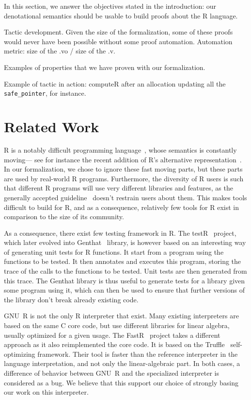 \documentclass[
    sigplan,
    10pt,
    review, %
    natbib=false %
 ]{acmart}
\begin{document}
In this section,
we answer the objectives stated in the introduction:
our denotational semantics should be usable to build proofs about the R language.

\todo{}

Tactic development.
Given the size of the formalization, some of these proofs would never have been possible
without some proof automation.
Automation metric: size of the .vo / size of the .v.

Examples of properties that we have proven with our formalization.

Example of tactic in action:
computeR after an allocation updating all the \texttt{safe_pointer}, for instance.

\section{Related Work}
\label{sec:related:work}

R is a notably difficult programming language~\parencite{RInferno},
whose semantics is constantly moving---%
see for instance the recent addition
of R's alternative representation~\parencite{altrepR}.
In our formalization, we chose to ignore these fast moving parts,
but these parts are used by real-world R programs.
Furthermore, the diversity of R users is such that different R programs
will use very different libraries and features,
as the generally accepted guideline~\parencite{RGuidelines}
doesn't restrain users about them.
This makes tools difficult to build for R,
and as a consequence, relatively few tools for R exist
in comparison to the size of its community.

As a consequence,
there exist few testing framework in R.
The testR~\parencite{maj2013testr, 2014testr} project,
which later evolved into Genthat~\parencite{genthat} library,
is however based on an interesting way of generating unit tests for R functions.
It start from a program using the functions to be tested.
It then annotates and executes this program,
storing the trace of the calls to the functions to be tested.
Unit tests are then generated from this trace.
The Genthat library is thus useful to generate tests for a library
given some program using it,
which can then be used to ensure that further versions of the library
don't break already existing code.

GNU~R is not the only R interpreter that exist.
Many existing interpreters are based on the same C core code,
but use different libraries for linear algebra,
usually optimized for a given usage.
%
The FastR~\parencite{kalibera2014fast} project takes a different approach
as it also reimplemented the core code.
It is based on the Truffle~\parencite{wuerthingertruffle}
self-optimizing framework.
Their tool is faster than the reference interpreter
in the language interpretation, and not only the linear-algebraic part.
%
In both cases, a difference of behavior between GNU~R
and the specialized interpreter is considered as a bug.
We believe that this support our choice of strongly basing
our work on this interpreter.
\end{document}
